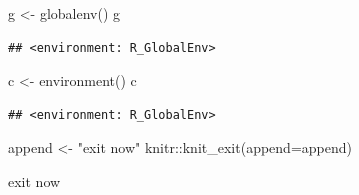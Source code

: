 \documentclass[
  10pt,
]{article}
\newenvironment{Shaded}{\begin{snugshade}}{\end{snugshade}}
\newcommand{\AttributeTok}[1]{\textcolor[rgb]{0.77,0.63,0.00}{#1}}
\newcommand{\FunctionTok}[1]{\textcolor[rgb]{0.00,0.00,0.00}{#1}}
\newcommand{\NormalTok}[1]{#1}
\newcommand{\OtherTok}[1]{\textcolor[rgb]{0.56,0.35,0.01}{#1}}
\newcommand{\SpecialCharTok}[1]{\textcolor[rgb]{0.00,0.00,0.00}{#1}}
\newcommand{\StringTok}[1]{\textcolor[rgb]{0.31,0.60,0.02}{#1}}
\begin{document}
\begin{Shaded}
\begin{Highlighting}[]
\NormalTok{g  }\OtherTok{\textless{}{-}} \FunctionTok{globalenv}\NormalTok{()}
\NormalTok{g}
\end{Highlighting}
\end{Shaded}

\begin{verbatim}
## <environment: R_GlobalEnv>
\end{verbatim}

\begin{Shaded}
\begin{Highlighting}[]
\NormalTok{c  }\OtherTok{\textless{}{-}} \FunctionTok{environment}\NormalTok{()}
\NormalTok{c}
\end{Highlighting}
\end{Shaded}

\begin{verbatim}
## <environment: R_GlobalEnv>
\end{verbatim}

\begin{Shaded}
\begin{Highlighting}[]
\NormalTok{append  }\OtherTok{\textless{}{-}} \StringTok{"exit now"}
\NormalTok{knitr}\SpecialCharTok{::}\FunctionTok{knit\_exit}\NormalTok{(}\AttributeTok{append=}\NormalTok{append)}
\end{Highlighting}
\end{Shaded}

exit now
\end{document}
